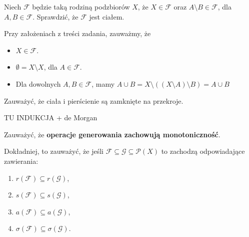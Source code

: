 \begin{problem}[10.1.2]
	Niech $\mathcal{F}$ będzie taką rodziną podzbiorów $X$, że $X\in \mathcal{F}$ oraz $A\setminus B\in \mathcal{F}$, dla $A,B \in \mathcal{F}$. Sprawdzić, że $\mathcal{F}$ jest ciałem.
\end{problem} 
 \begin{solution}
	Przy założeniach z treści zadania, zauważmy, że
	\begin{itemize}
                \item $X\in \mathcal{F}$.	
		\item $\emptyset = X\setminus X$, dla $A \in \mathcal{F}$.
		\item Dla dowolnych $A,B \in \mathcal{F}$, mamy $ A\cup B = X \setminus  \left( (X\setminus A) \setminus B  \right)   = A\cup B$
	\end{itemize}
\end{solution} 
\begin{problem}[10.1.3]
	Zauważyć, że ciała i pierścienie są zamknięte na przekroje.
\end{problem} 
\begin{solution}
	TU INDUKCJA + de Morgan
\end{solution} 
\begin{problem}[10.1.4]
	Zauważyć, że \textbf{operacje generowania zachowują monotoniczność}. 

	Dokładniej, to zauważyć, że jeśli $\mathcal{F}\subseteq \mathcal{G}\subseteq \mathcal{P}(X) $ to zachodzą odpowiadające zawierania:
	\begin{enumerate}[label=\arabic*)]
		\item $r\left( \mathcal{F} \right) \subseteq r\left( \mathcal{G} \right) $,
		\item $s\left( \mathcal{F} \right) \subseteq s\left( \mathcal{G} \right) $,
		\item $a\left( \mathcal{F} \right) \subseteq a\left( \mathcal{G} \right) $,
		\item $\sigma \left( \mathcal{F} \right) \subseteq \sigma \left( \mathcal{G} \right) $.
	\end{enumerate}
\end{problem} 
